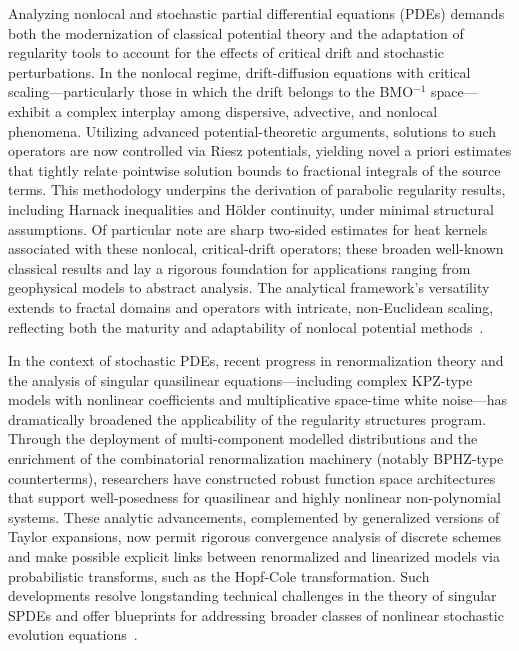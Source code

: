 \documentclass[sigconf]{acmart}
\begin{document}
Analyzing nonlocal and stochastic partial differential equations (PDEs) demands both the modernization of classical potential theory and the adaptation of regularity tools to account for the effects of critical drift and stochastic perturbations. In the nonlocal regime, drift-diffusion equations with critical scaling—particularly those in which the drift belongs to the BMO$^{-1}$ space—exhibit a complex interplay among dispersive, advective, and nonlocal phenomena. Utilizing advanced potential-theoretic arguments, solutions to such operators are now controlled via Riesz potentials, yielding novel a priori estimates that tightly relate pointwise solution bounds to fractional integrals of the source terms. This methodology underpins the derivation of parabolic regularity results, including Harnack inequalities and Hölder continuity, under minimal structural assumptions. Of particular note are sharp two-sided estimates for heat kernels associated with these nonlocal, critical-drift operators; these broaden well-known classical results and lay a rigorous foundation for applications ranging from geophysical models to abstract analysis. The analytical framework's versatility extends to fractal domains and operators with intricate, non-Euclidean scaling, reflecting both the maturity and adaptability of nonlocal potential methods~\cite{ref95}.

In the context of stochastic PDEs, recent progress in renormalization theory and the analysis of singular quasilinear equations—including complex KPZ-type models with nonlinear coefficients and multiplicative space-time white noise—has dramatically broadened the applicability of the regularity structures program. Through the deployment of multi-component modelled distributions and the enrichment of the combinatorial renormalization machinery (notably BPHZ-type counterterms), researchers have constructed robust function space architectures that support well-posedness for quasilinear and highly nonlinear non-polynomial systems. These analytic advancements, complemented by generalized versions of Taylor expansions, now permit rigorous convergence analysis of discrete schemes and make possible explicit links between renormalized and linearized models via probabilistic transforms, such as the Hopf-Cole transformation. Such developments resolve longstanding technical challenges in the theory of singular SPDEs and offer blueprints for addressing broader classes of nonlinear stochastic evolution equations~\cite{ref94}.
\end{document}
